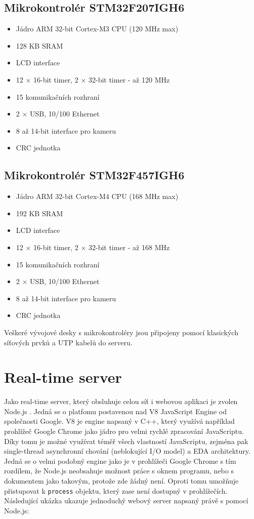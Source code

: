 \subsection{Mikrokontrolér STM32F207IGH6}
\begin{itemize}
\itemsep0em
\item Jádro ARM 32-bit Cortex\texttrademark-M3 CPU (120 MHz max)
\item 128 KB SRAM
\item LCD interface
\item 12 \ensuremath{\times} 16-bit timer, 2 \ensuremath{\times} 32-bit timer - až 120 MHz
\item 15 komunikačních rozhraní
\item 2 \ensuremath{\times} USB, 10/100 Ethernet
\item 8 až 14-bit interface pro kameru
\item CRC jednotka
\end{itemize}

\subsection{Mikrokontrolér STM32F457IGH6}
\begin{itemize}
\itemsep0em
\item Jádro ARM 32-bit Cortex\texttrademark-M4 CPU (168 MHz max)
\item 192 KB SRAM
\item LCD interface
\item 12 \ensuremath{\times} 16-bit timer, 2 \ensuremath{\times} 32-bit timer - až 168 MHz
\item 15 komunikačních rozhraní
\item 2 \ensuremath{\times} USB, 10/100 Ethernet
\item 8 až 14-bit interface pro kameru
\item CRC jednotka
\end{itemize}

Veškeré vývojové desky s mikrokontroléry jsou připojeny pomocí klasických síťových prvků a UTP kabelů do serveru.

\section{Real-time server}
Jako real-time  server, který obsluhuje celou síť i webovou aplikaci je zvolen Node.js \cite{nodejs}.  Jedná se o platfomu postavenou nad V8 JavaScript Engine od společnosti Google. V8  je engine napsaný v C++, který využívá například prohlížeč Google Chrome jako jádro pro velmi rychlé zpracování JavaScriptu. Díky tomu je možné využívat téměř všech vlastností JavaScriptu, zejména pak single-thread asynchronní chování (neblokující I/O model) a EDA architektury. Jedná se o velmi podobný engine jako je v prohlížeči Google Chrome s tím rozdílem, že Node.js neobsahuje možnost práce s oknem programu, nebo s dokumentem jako takovým, protože zde žádný není. Oproti tomu umožňuje přistupovat k \texttt{process} objektu, který zase není dostupný v prohlížečích. Následující ukázka ukazuje jednoduchý webový server napsaný právě s pomocí Node.js:

